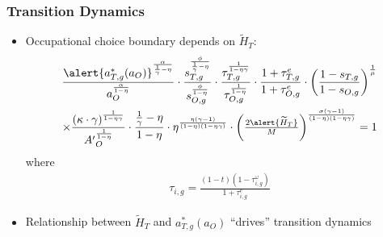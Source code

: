 \documentclass[11pt,hyperref={bookmarks=false},table,aspectratio=169]{beamer}
\begin{document}
\begin{frame}\label{td}
\frametitle{Transition Dynamics}
\begin{itemize}
  \item Occupational choice boundary depends on $\widetilde{H}_T$:
  \begin{align*}
	\frac{\alert{{a}_{T,g}^*(a_O)}^\frac{\alpha}{\frac{1}{\gamma}-\eta}}{a_O^\frac{\alpha}{1-\eta}} \cdot \frac{s_{T,g}^\frac{\phi}{\frac{1}{\gamma}-\eta}}{s_{O,g}^\frac{\phi}{1-\eta}}\cdot \frac{\tau_{T,g}^\frac{1}{1-\eta\gamma}}{\tau_{O,g}^\frac{1}{1-\eta}} \cdot \frac{1+\tau^e_{T,g}}{1+\tau^e_{O,g}}\cdot \left(\frac{1-s_{T,g}}{1-s_{O,g}}\right)^\frac{1}{\mu} \nonumber\\
	\times \frac{\left(\kappa \cdot \gamma\right)^\frac{1}{1-\eta\gamma}}{{A'}_O^\frac{1}{1-\eta}} \cdot \frac{\frac{1}{\gamma}-\eta}{1-\eta}\cdot \eta^\frac{\eta(\gamma-1)}{(1-\eta)(1-\eta\gamma)} \cdot \left(\tfrac{2\alert{\widetilde{H}_T}}{M}\right)^{\frac{\sigma(\gamma-1)}{(1-\eta)(1-\eta\gamma)}}=1 \nonumber%
\end{align*}
where
\begin{align}
	\tau_{i,g} =\frac{(1-t)(1-\tau^{\omega}_{i,g})}{1+\tau^e_{i,g}} \nonumber
\end{align}
  \item Relationship between $\widetilde{H}_T$ and ${a}_{T,g}^*(a_O)$ ``drives'' transition dynamics \hfill \hyperlink{eqm}{}
\end{itemize}
\end{frame}
\end{document}

